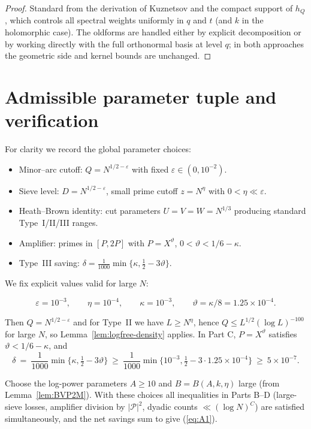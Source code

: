 \documentclass[11pt]{article}
\def\eqref#1{(\ref{#1})}%
\theoremstyle{definition}
\theoremstyle{remark}
\numberwithin{equation}{part}
\begin{document}
\begin{proof}
	Standard from the derivation of Kuznetsov and the compact support of $h_Q$, which controls all spectral weights uniformly in $q$ and $t$ (and $k$ in the holomorphic case). The oldforms are handled either by explicit decomposition or by working directly with the full orthonormal basis at level $q$; in both approaches the geometric side and kernel bounds are unchanged.
\end{proof}

\section{Admissible parameter tuple and verification}

For clarity we record the global parameter choices:
\begin{itemize}
	\item Minor--arc cutoff: $Q=N^{1/2-\varepsilon}$ with fixed $\varepsilon\in(0,10^{-2})$.
	\item Sieve level: $D=N^{1/2-\varepsilon}$, small prime cutoff $z=N^\eta$ with $0<\eta\ll\varepsilon$.
	\item Heath--Brown identity: cut parameters $U=V=W=N^{1/3}$ producing standard Type~I/II/III ranges.
	\item Amplifier: primes in $[P,2P]$ with $P=X^\vartheta$, $0<\vartheta<1/6-\kappa$.
	\item Type~III saving: $\delta=\tfrac{1}{1000}\min\{\kappa,\tfrac12-3\vartheta\}$.
\end{itemize}


We fix explicit values valid for large $N$:

\[
	\varepsilon=10^{-3},\qquad \eta=10^{-4},\qquad \kappa=10^{-3},\qquad \vartheta=\kappa/8=1.25\times 10^{-4}.
\]

Then $Q=N^{1/2-\varepsilon}$ and for Type~II we have $L\ge N^{\eta}$, hence $Q\le L^{1/2}(\log L)^{-100}$ for large $N$, so Lemma~\ref{lem:logfree-density} applies. In Part C, $P=X^{\vartheta}$ satisfies $\vartheta<1/6-\kappa$, and
\[
	\delta\ =\ \frac1{1000}\min\{\kappa,\tfrac12-3\vartheta\}\ \ge\ \frac{1}{1000}\min\{10^{-3},\tfrac12-3\cdot 1.25\times 10^{-4}\}\ \ge\ 5\times 10^{-7}.
\]

Choose the log-power parameters $A\ge 10$ and $B=B(A,k,\eta)$ large (from Lemma~\ref{lem:BVP2M}). With these choices all inequalities in Parts B--D (large-sieve losses, amplifier division by $|\mathcal P|^2$, dyadic counts $\ll (\log N)^C$) are satisfied simultaneously, and the net savings sum to give \eqref{eq:A1}.
\end{document}
